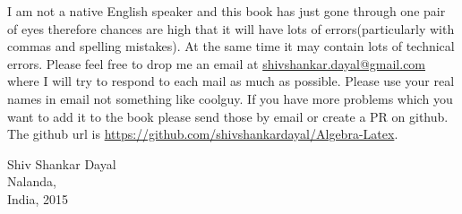 I am not a native English speaker and this book has just gone through one pair
of eyes therefore chances are high that it will have lots of errors(particularly with commas and spelling mistakes). At the
same time it may contain lots of technical errors. Please feel free to drop me
an email at
\href{mailto:shivshankar.dayal@gmail.com}{shivshankar.dayal@gmail.com} where I
will try to respond to each mail as
much as possible. Please use your real names in email not something like
coolguy. If you have more problems which you want to add it to the book please send
those by email or create a PR on github. The github url is \url{https://github.com/shivshankardayal/Algebra-Latex}.
\begin{flushright}
Shiv Shankar Dayal\\
Nalanda,\\
India, 2015
\end{flushright}

